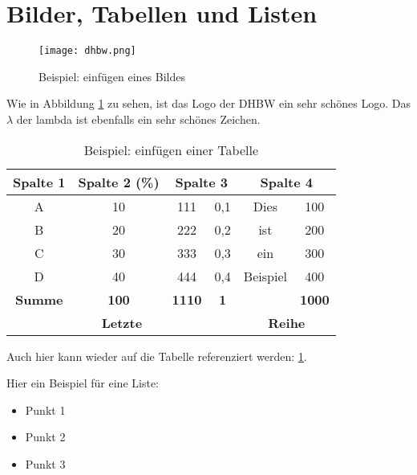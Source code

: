 
\newpage
\section{Bilder, Tabellen und Listen}


\begin{figure}[h]
    \centering
    \texttt{[image: dhbw.png]}
    \caption{Beispiel: einfügen eines Bildes \cite{Mustermann2023}}
    \label{fig:Bsp_Bild}
\end{figure}

Wie in Abbildung \ref{fig:Bsp_Bild} zu sehen, ist das Logo der \ac{DHBW} ein sehr schönes Logo. Das $\lambda$ der \ac{lambda} ist ebenfalls ein sehr schönes Zeichen.


\vspace{0.5cm}
\begin{table}[h]
    \centering
    \begin{tabular}[c]{|c|c|c|c|c|c|}
        \hline
            \textbf{Spalte 1} & 
            \textbf{Spalte 2 (\%)} &  
            \multicolumn{2}{|c|}{\textbf{Spalte 3}} & 
            \multicolumn{2}{|c|}{\textbf{Spalte 4}}\\
        \hline
            A &     10 &    111 &   0,1 &   Dies &      100 \\
        \hline
            B &     20 &    222 &   0,2 &   ist &       200 \\
        \hline
            C &     30 &    333 &   0,3 &   ein &       300 \\
        \hline
            D &     40 &    444 &   0,4 &   Beispiel &  400 \\
        \hline
            \textbf{Summe} &
            \textbf{100} &
            \textbf{1110} &
            \textbf{1} &  &
            \textbf{1000}\\
        \hline
            \multicolumn{4}{|c|}{\textbf{Letzte}} & 
            \multicolumn{2}{|c|}{\textbf{Reihe}} \\
        \hline
    \end{tabular}
    \caption{Beispiel: einfügen einer Tabelle}
    \label{tab:Bsp_Tabelle}
\end{table}

Auch hier kann wieder auf die Tabelle referenziert werden: \ref{tab:Bsp_Tabelle}.


\vspace{0.5cm}
Hier ein Beispiel für eine Liste:
\begin{itemize}[label=\textbullet]
    \item Punkt 1
    \item Punkt 2
    \item Punkt 3
\end{itemize}